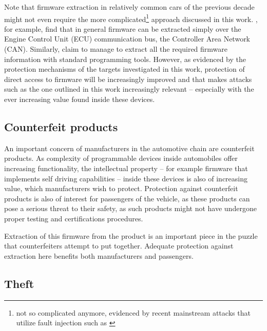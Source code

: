 \documentclass[10pt]{article}
\begin{document}
      Note that firmware extraction in relatively common cars of the previous decade might not even require the more complicated\footnote{not so complicated anymore, evidenced by recent mainstream attacks that utilize fault injection such as \cite{c3tv_2016}} approach discussed in this work. \citet{checkoway_comprehensive_2011}, for example, find that in general firmware can be extracted simply over the Engine Control Unit (ECU) communication bus, the Controller Area Network (CAN). Similarly, \citet{garcia_lock_2016} claim to manage to extract all the required firmware information with standard programming tools. However, as evidenced by the protection mechanisms of the targets investigated in this work, protection of direct access to firmware will be increasingly improved and that makes attacks such as the one outlined in this work increasingly relevant -- especially with the ever increasing value found inside these devices. 

      \subsection{Counterfeit products}
      \label{sec:counterfeit}

        An important concern of manufacturers in the automotive chain are counterfeit products. As complexity of programmable devices inside automobiles offer increasing functionality, the intellectual property -- for example firmware that implements self driving capabilities -- inside these devices is also of increasing value, which manufacturers wish to protect. Protection against counterfeit products is also of interest for passengers of the vehicle, as these products can pose a serious threat to their safety, as such products might not have undergone proper testing and certifications procedures.

        Extraction of this firmware from the product is an important piece in the puzzle that counterfeiters attempt to put together. Adequate protection against extraction here benefits both manufacturers and passengers. 


      \subsection{Theft}
      \label{sec:steal}
\end{document}
